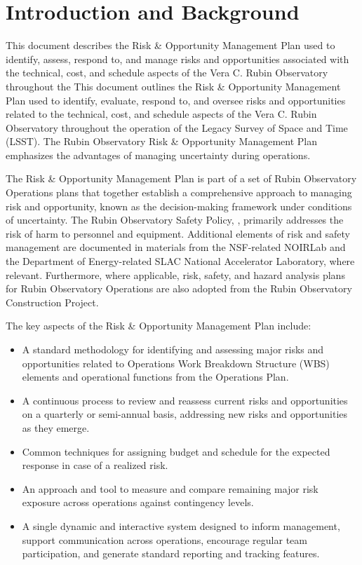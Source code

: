 \section{Introduction and Background}

This document describes the Risk \& Opportunity Management Plan used to identify, assess, respond to, and manage risks and opportunities associated with the technical, cost, and schedule aspects of the Vera C. Rubin Observatory throughout the This document outlines the Risk \& Opportunity Management Plan used to identify, evaluate, respond to, and oversee risks and opportunities related to the technical, cost, and schedule aspects of the Vera C. Rubin Observatory throughout the operation of the Legacy Survey of Space and Time (LSST). The Rubin Observatory Risk \& Opportunity Management Plan emphasizes the advantages of managing uncertainty during operations.

The Risk \& Opportunity Management Plan is part of a set of Rubin Observatory Operations plans that together establish a comprehensive approach to managing risk and opportunity, known as the decision-making framework under conditions of uncertainty.
The Rubin Observatory Safety Policy, , primarily addresses the risk of harm to personnel and equipment.
Additional elements of risk and safety management are documented in materials from the NSF-related NOIRLab and the Department of Energy-related SLAC National Accelerator Laboratory, where relevant.
Furthermore, where applicable, risk, safety, and hazard analysis plans for Rubin Observatory Operations are also adopted from the Rubin Observatory Construction Project.

The key aspects of the Risk \& Opportunity Management Plan include:
\begin{itemize}
	\item A standard methodology for identifying and assessing major risks and opportunities related to Operations Work Breakdown Structure (WBS) elements and operational functions from the Operations Plan.

	\item A continuous process to review and reassess current risks and opportunities on a quarterly or semi-annual basis, addressing new risks and opportunities as they emerge.
	
	\item Common techniques for assigning budget and schedule for the expected response in case of a realized risk.
	
	\item An approach and tool to measure and compare remaining major risk exposure across operations against contingency levels.
	
	\item A single dynamic and interactive system designed to inform management, support communication across operations, encourage regular team participation, and generate standard reporting and tracking features.
\end{itemize}


